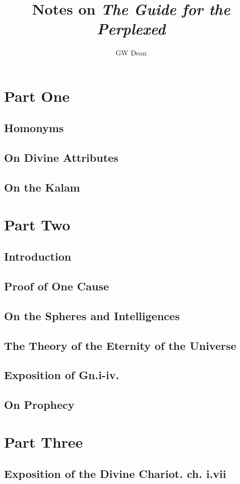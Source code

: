 \documentclass[a4paper,11pt]{article}
\author{GW Dean}
\title{Notes on \emph{The Guide for the Perplexed}}
\begin{document}
\maketitle
\tableofcontents
\section{Part One}
\subsection{Homonyms}
\subsection{On Divine Attributes}
\subsection{On the Kalam}
\section{Part Two}
\subsection{Introduction}
\subsection{Proof of One Cause}
\subsection{On the Spheres and Intelligences}
\subsection{The Theory of the Eternity of the Universe}
\subsection{Exposition of Gn.i-iv.}
\subsection{On Prophecy}
\section{Part Three}
\subsection{Exposition of the Divine Chariot. ch. i.vii}
\end{document}
